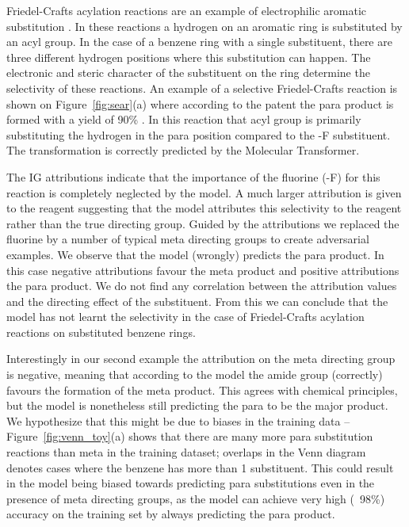 Friedel-Crafts acylation reactions are an example of electrophilic aromatic substitution \cite{Friedel1877}. In these reactions a hydrogen on an aromatic ring is substituted by an acyl group. In the case of a benzene ring with a single substituent, there are three different hydrogen positions where this substitution can happen. The electronic and steric character of the substituent on the ring determine the selectivity of these reactions. An example of a selective Friedel-Crafts reaction is shown on Figure~\ref{fig:sear}(a) where according to the patent the para product is formed with a yield of 90\% \cite{fc_para1981}. In this reaction that acyl group is primarily substituting the hydrogen in the para position compared to the -F substituent. The transformation is correctly predicted by the Molecular Transformer. 

The IG attributions indicate that the importance of the fluorine (-F) for this reaction is completely neglected by the model. A much larger attribution is given to the reagent suggesting that the model attributes this selectivity to the reagent rather than the true directing group. Guided by the attributions we replaced the fluorine by a number of typical meta directing groups to create adversarial examples. We observe that the model (wrongly) predicts the para product. In this case negative attributions favour the meta product and positive attributions the para product. We do not find any correlation between the attribution values and the directing effect of the substituent. From this we can conclude that the model has not learnt the selectivity in the case of Friedel-Crafts acylation reactions on substituted benzene rings. 

Interestingly in our second example the attribution on the meta directing group is negative, meaning that according to the model the amide group (correctly) favours the formation of the meta product. This agrees with chemical principles, but the model is nonetheless still predicting the para to be the major product. We hypothesize that this might be due to biases in the training data -- Figure~\ref{fig:venn_toy}(a) shows that there are many more para substitution reactions than meta in the training dataset; overlaps in the Venn diagram denotes cases where the benzene has more than 1 substituent. This could result in the model being biased towards predicting para substitutions even in the presence of meta directing groups, as the model can achieve very high (~98\%) accuracy on the training set by always predicting the para product.

